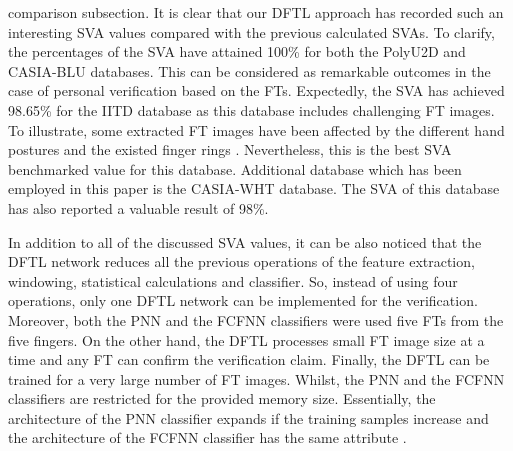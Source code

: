\documentclass[conference]{IEEEtran}
\begin{document}
comparison subsection. It is clear that our DFTL approach has recorded such an interesting SVA values compared with the previous calculated SVAs. To clarify, the percentages of the SVA have attained 100\% for both the PolyU2D and CASIA-BLU databases. This can be considered as remarkable outcomes in the case of personal verification based on the FTs. Expectedly, the SVA has achieved 98.65\% for the IITD database as this database includes challenging FT images. To illustrate, some extracted FT images have been affected by the different hand postures and the existed finger rings \cite{Al-Nima2017efficient}. Nevertheless, this is the best SVA benchmarked value for this database. Additional database which has been employed in this paper is the CASIA-WHT database. The SVA of this database has also reported a valuable result of 98\%. 

In addition to all of the discussed SVA values, it can be also noticed that the DFTL network reduces all the previous operations of the feature extraction, windowing, statistical calculations and classifier. So, instead of using four operations, only one DFTL network can be implemented for the verification. Moreover, both the PNN and the FCFNN classifiers were used five FTs from the five fingers. On the other hand, the DFTL processes small FT image size at a time and any FT can confirm the verification claim. Finally, the DFTL can be trained for a very large number of FT images. Whilst, the PNN and the FCFNN classifiers are restricted for the provided memory size. Essentially, the architecture of the PNN classifier expands if the training samples increase \cite{shorrock2000biometric} and the architecture of the FCFNN classifier has the same attribute \cite{Al-Nima2017finger}.
\end{document}
